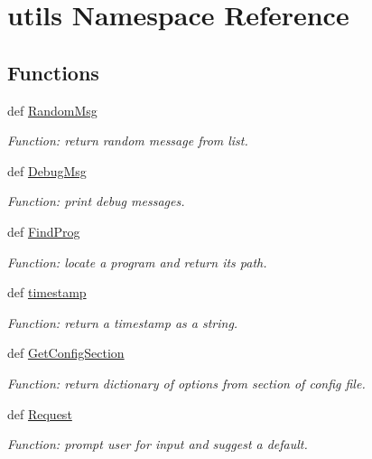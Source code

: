 \hypertarget{namespaceutils}{\section{utils \-Namespace \-Reference}
\label{namespaceutils}
}
\subsection*{\-Functions}
\begin{DoxyCompactItemize}
\item 
def \hyperlink{namespaceutils_a17b230eb88f99a55015827768f6d5c6e}{\-Random\-Msg}
\begin{DoxyCompactList}\small\item\em \-Function\-: return random message from list. \end{DoxyCompactList}\item 
def \hyperlink{namespaceutils_af5ae3c1612e367892e58315a2940e915}{\-Debug\-Msg}
\begin{DoxyCompactList}\small\item\em \-Function\-: print debug messages. \end{DoxyCompactList}\item 
def \hyperlink{namespaceutils_a5ef7bf1967d090f2ecaa50e9c8ab6493}{\-Find\-Prog}
\begin{DoxyCompactList}\small\item\em \-Function\-: locate a program and return its path. \end{DoxyCompactList}\item 
def \hyperlink{namespaceutils_a927f86c5699bd9ab878049b546c362d0}{timestamp}
\begin{DoxyCompactList}\small\item\em \-Function\-: return a timestamp as a string. \end{DoxyCompactList}\item 
def \hyperlink{namespaceutils_aa25951c5f891d358a3f096d8a4a57e15}{\-Get\-Config\-Section}
\begin{DoxyCompactList}\small\item\em \-Function\-: return dictionary of options from section of config file. \end{DoxyCompactList}\item 
def \hyperlink{namespaceutils_acb9359809500c419d9a89eb8f0ae5a60}{\-Request}
\begin{DoxyCompactList}\small\item\em \-Function\-: prompt user for input and suggest a default. \end{DoxyCompactList}\item 

\end{DoxyCompactItemize}
